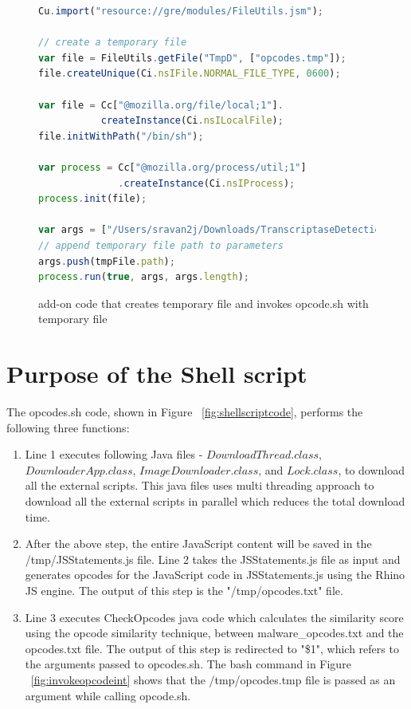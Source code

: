 \begin{figure}[h]
  \centering
\begin{lstlisting}[frame=single,language=JavaScript,mathescape=false]
Cu.import("resource://gre/modules/FileUtils.jsm");

// create a temporary file
var file = FileUtils.getFile("TmpD", ["opcodes.tmp"]);
file.createUnique(Ci.nsIFile.NORMAL_FILE_TYPE, 0600);

var file = Cc["@mozilla.org/file/local;1"].
           createInstance(Ci.nsILocalFile);
file.initWithPath("/bin/sh");

var process = Cc["@mozilla.org/process/util;1"]
              .createInstance(Ci.nsIProcess);
process.init(file);

var args = ["/Users/sravan2j/Downloads/TranscriptaseDetectionAddon/data/opcode.sh"];
// append temporary file path to parameters
args.push(tmpFile.path);
process.run(true, args, args.length);
\end{lstlisting}
\caption[add-on code to invoke opcode.sh]{add-on code that creates temporary file and invokes opcode.sh with temporary file}
    \label{fig:invokeopcode}
\end{figure}

\section{Purpose of the Shell script}

The opcodes.sh code, shown in Figure ~\ref{fig:shellscriptcode}, performs the following three functions:
\begin{enumerate}
\item Line 1 executes following Java files - $DownloadThread.class$, $DownloaderApp.class$, $ImageDownloader.class$, and $Lock.class$, to download all the external scripts. This java files uses multi threading approach to download all the external scripts in parallel which reduces the total download time.  
\item After the above step, the entire JavaScript content will be saved in the /tmp/JSStatements.js file. Line 2 takes the JSStatements.js file as input and generates opcodes for the JavaScript code in JSStatements.js using the Rhino JS engine. The output of this step is the "/tmp/opcodes.txt" file.
\item Line 3 executes CheckOpcodes java code which calculates the similarity score using the opcode similarity technique, between malware\_opcodes.txt and the opcodes.txt file. The output of this step is redirected to "\$1", which refers to the arguments passed to opcodes.sh. The bash command in Figure ~\ref{fig:invokeopcodeint} shows that the /tmp/opcodes.tmp file is passed as an argument while calling opcode.sh. 
\end{enumerate}

